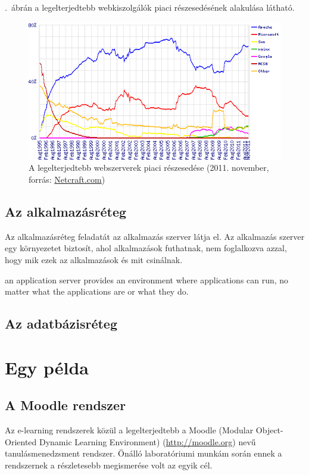 .~ábrán a legelterjedtebb webkiszolgálók piaci részesedésének alakulása látható.

\begin{figure}[h!]
\centering
\includegraphics[width=1.0\textwidth]{figures/wpid-overallc.png}
\caption{A legelterjedtebb webszerverek piaci részesedése (2011. november, forrás: \href{http://news.netcraft.com/archives/2011/11/07/november-2011-web-server-survey.html}{Netcraft.com}) \label{fig:netcraft_webservers}}
\end{figure} 


\subsection{Az alkalmazásréteg}
Az alkalmazásréteg feladatát az alkalmazás szerver látja el. Az alkalmazás szerver egy környezetet biztosít, ahol alkalmazások futhatnak, nem foglalkozva azzal, hogy mik ezek az alkalmazások és mit csinálnak.\cite{serverside} 

 an application server provides an environment where applications can run, no matter what the applications are or what they do.
\subsection{Az adatbázisréteg}

\section{Egy példa}
\subsection{A Moodle rendszer}
Az e-learning rendszerek közül a legelterjedtebb a Moodle (Modular Object-Oriented Dynamic Learning Environment) (\href{http://moodle.org}{http://moodle.org}) nevű tanulásmenedzsment rendszer. Önálló laboratóriumi munkám során ennek a rendszernek a részletesebb megismerése volt az egyik cél.

